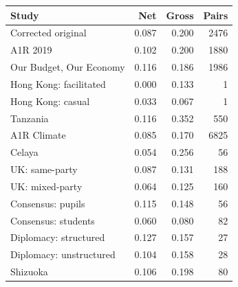 
\begin{tabular}{lrrr}
\toprule
Study & Net & Gross & Pairs\\
\midrule
Corrected original & 0.087 & 0.200 & 2476\\
A1R 2019 & 0.102 & 0.200 & 1880\\
Our Budget, Our Economy & 0.116 & 0.186 & 1986\\
Hong Kong: facilitated & 0.000 & 0.133 & 1\\
Hong Kong: casual & 0.033 & 0.067 & 1\\
\addlinespace
Tanzania & 0.116 & 0.352 & 550\\
A1R Climate & 0.085 & 0.170 & 6825\\
Celaya & 0.054 & 0.256 & 56\\
UK: same-party & 0.087 & 0.131 & 188\\
UK: mixed-party & 0.064 & 0.125 & 160\\
\addlinespace
Consensus: pupils & 0.115 & 0.148 & 56\\
Consensus: students & 0.060 & 0.080 & 82\\
Diplomacy: structured & 0.127 & 0.157 & 27\\
Diplomacy: unstructured & 0.104 & 0.158 & 28\\
Shizuoka & 0.106 & 0.198 & 80\\
\bottomrule
\end{tabular}
